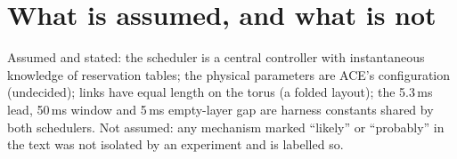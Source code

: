 \section{What is assumed, and what is not}
Assumed and stated: the scheduler is a central controller with instantaneous knowledge of reservation tables; the physical parameters are ACE's configuration (undecided); links have equal length on the torus (a folded layout); the 5.3\,ms lead, 50\,ms window and 5\,ms empty-layer gap are harness constants shared by both schedulers.
Not assumed: any mechanism marked ``likely'' or ``probably'' in the text was not isolated by an experiment and is labelled so.
